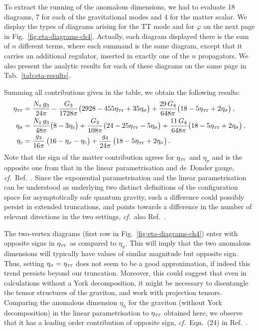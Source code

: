 \documentclass[11pt]{book}
\newcommand\TTspace{ -1pt }
\newcommand\etaTT{ \eta_{\scriptscriptstyle{\mathrm{T\hspace{\TTspace}T}}} }
\newcommand\etaS{ \eta_{\scriptscriptstyle{\mathrm{S}}} }
\newcommand\NS{ N_{\scriptscriptstyle{\mathrm{S}}} }
\newcommand\cf{\textit{cf.}\ }
\numberwithin{equation}{chapter}
\begin{document}
To extract the running of the anomalous dimensions, we had to evaluate 18 diagrams, 7 for
each of the gravitational modes and 4 for the matter scalar. We display the types of
diagrams arising for the $\mathrm{TT}$ mode and for $\varphi$ on the next page in
Fig.~\ref{fig:eta-diagrams-ch4}.
Actually, each diagram displayed there is the sum of $n$ different terms,
where each summand is the same diagram, except that it carries an additional regulator,
inserted in exactly one of the $n$ propagators. We also present the analytic results for
each of these diagrams on the same page in Tab.~\ref{tab:eta-results}.

Summing all contributions given in the table, we obtain the following results:
\begin{align}
  \etaTT      &= \frac{\NS \, g_3}{24 \pi} - \frac{G_3}{1728 \pi} \big( 2928 - 455 \etaTT + 35 \eta_\sigma \big)
  + \frac{29 \, G_4}{648 \pi} \big( 18 - 5 \etaTT + 2 \eta_\sigma \big) \,,
  \label{etaTTcomplete} \\
  \eta_\sigma &= \frac{\NS \, g_3}{48 \pi} \big( 8-3 \etaS \big) + \frac{G_3}{108 \pi} \big( 24 - 25\etaTT - 5 \eta_\sigma \big)
   +\frac{11 \, G_4}{648 \pi} \big( 18 - 5 \etaTT + 2 \eta_\sigma \big) \,,
  \label{etasigmacomplete} \\
  \etaS &= \frac{g_3}{16\pi} \, \big(16-\eta_{\sigma}-\etaS \big)
  + \frac{g_4}{24 \pi} \, \big( 18 - 5 \etaTT + 2 \eta_{\sigma} \big) \,.
\end{align}
Note that the sign of the matter contribution agrees for $\etaTT$ and $\eta_\sigma$
and is the opposite one from that in the linear parametrisation and de~Donder gauge,
\cf Ref.~\cite{Dona:2013qba}. Since the exponential parametrisation and the linear parametrisation
can be understood as underlying two distinct definitions of the configuration space for
asymptotically safe quantum gravity, such a difference could possibly persist in extended truncations,
and points towards a difference in the number of relevant directions in the two settings,
\cf also Ref.~\cite{Ohta:2015efa}.

The two-vertex diagrams (first row in Fig.~\ref{fig:eta-diagrams-ch4})
enter with opposite signs in $\etaTT$ as compared to $\eta_\sigma$.
This will imply that the two anomalous dimensions will typically have values of similar magnitude
but opposite sign. Thus, setting $\eta_\sigma = \etaTT$ does not seem to be a good approximation,
if indeed this trend persists beyond our truncation.
Moreover, this could suggest that even in calculations without a York decomposition,
it might be necessary to disentangle the tensor structures of the graviton,
and work with projection tensors.
Comparing the anomalous dimension
$\eta_h$ for the graviton (without York decomposition)
in the linear parametrisation to $\etaTT$ obtained here,
we observe that it has a leading order contribution
of opposite sign,
\cf Eqn.~(24) in Ref.~\cite{Dona:2013qba}.
\end{document}
